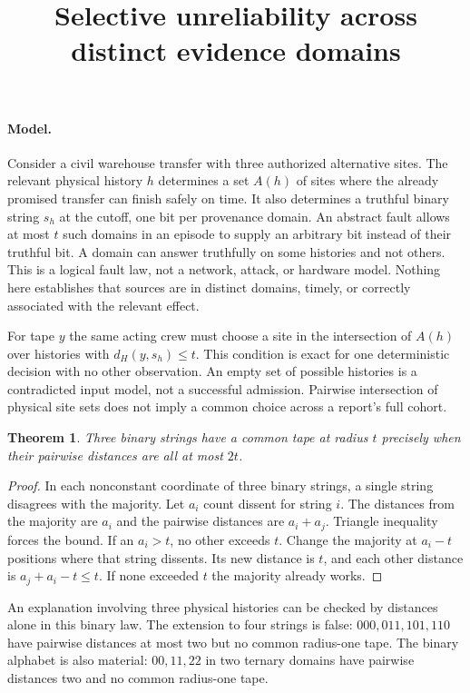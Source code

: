 \documentclass{article}
\newtheorem{theorem}{Theorem}
\begin{document}
\title{Selective unreliability across distinct evidence domains}
\maketitle

\paragraph{Model.}
Consider a civil warehouse transfer with three authorized alternative sites.
The relevant physical history $h$ determines a set $A(h)$ of sites
where the already promised transfer can finish safely on time. It also
determines a truthful binary string $s_h$ at the cutoff, one bit per
provenance domain. An abstract fault allows at most $t$ such domains in
an episode to supply an arbitrary bit instead of their truthful bit.
A domain can answer truthfully on some histories and not others.
This is a logical fault law, not a network, attack, or hardware model.
Nothing here establishes that sources are in distinct domains, timely,
or correctly associated with the relevant effect.

For tape $y$ the same acting crew must choose a site in the intersection
of $A(h)$ over histories with $d_H(y,s_h)\le t$. This condition is exact
for one deterministic decision with no other observation.
An empty set of possible histories is a contradicted input model, not
a successful admission. Pairwise intersection of physical site sets
does not imply a common choice across a report's full cohort.

\begin{theorem}
Three binary strings have a common tape at radius $t$ precisely when
their pairwise distances are all at most $2t$.
\end{theorem}
\begin{proof}
In each nonconstant coordinate of three binary strings, a single string
disagrees with the majority. Let $a_i$ count dissent for string $i$.
The distances from the majority are $a_i$ and the pairwise distances
are $a_i+a_j$. Triangle inequality forces the bound. If an $a_i>t$,
no other exceeds $t$. Change the majority at $a_i-t$ positions where
that string dissents. Its new distance is $t$, and each other distance
is $a_j+a_i-t\le t$. If none exceeded $t$ the majority already works.
\end{proof}
An explanation involving three physical histories can be checked by
distances alone in this binary law. The extension to four strings is
false: $000,011,101,110$ have pairwise distances at most two but no
common radius-one tape. The binary alphabet is also material:
$00,11,22$ in two ternary domains have pairwise distances two and no
common radius-one tape.
\end{document}
